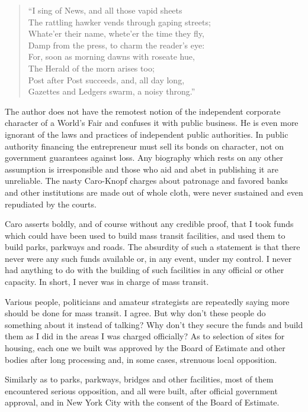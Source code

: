 \documentclass[11pt,letterpaper]{article}
\begin{document}
\begin{quote}
\enquote{I sing of News, and all those vapid sheets\\
The rattling hawker vends through gaping streets;\\
Whate'er their name, whete'er the time they fly,\\
Damp from the press, to charm the reader's eye:\\
For, soon as morning dawns with roseate hue,\\
The Herald of the morn arises too;\\
Post after Post succeeds, and, all day long,\\
Gazettes and Ledgers swarm, a noisy throng.}
\end{quote}

The author does not have the remotest notion of the independent corporate character of a World's Fair and confuses it with public business. He is even more ignorant of the laws and practices of independent public authorities. In public authority financing the entrepreneur must sell its bonds on character, not on government guarantees against loss. Any biography which rests on any other assumption is irresponsible and those who aid and abet in publishing it are unreliable. The nasty Caro-Knopf charges about patronage and favored banks and other institutions are made out of whole cloth, were never sustained and even repudiated by the courts.

Caro asserts boldly, and of course without any credible proof, that I took funds which could have been used to build mass transit facilities, and used them to build parks, parkways and roads. The absurdity of such a statement is that there never were any such funds available or, in any event, under my control. I never had anything to do with the building of such facilities in any official or other capacity. In short, I never was in charge of mass transit.

Various people, politicians and amateur strategists are repeatedly saying more should be done for mass transit. I agree. But why don't these people do something about it instead of talking? Why don't they secure the funds and build them as I did in the areas I was charged officially? As to selection of sites for housing, each one we built was approved by the Board of Estimate and other bodies after long processing and, in some cases, strenuous local opposition.

Similarly as to parks, parkways, bridges and other facilities, most of them encountered serious opposition, and all were built, after official government approval, and in New York City with the consent of the Board of Estimate.
\end{document}
